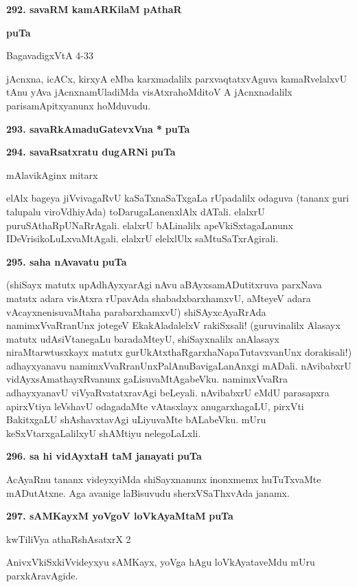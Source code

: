 \noindent
\textbf{292. savaRM kamARKilaM pAthaR} \hfill {\bf puTa \pageref{63}

\hfill BagavadigxVtA 4-33

\smallskip
jAcnxna, icACx, kirxyA eMba karxmadalilx parxvaqtatxvAguva kamaRvelalxvU tAnu yAva jAcnxnamUladiMda visAtxrahoMditoV A jAcnxnadalilx parisamApitxyanunx hoMduvudu.

\medskip
\noindent
\textbf{293. savaRkAmaduGatevxVna *} \hfill {\bf puTa \pageref{95}}

\smallskip
\noindent
\textbf{294. savaRsatxratu dugARNi} \hfill {\bf puTa \pageref{244}}

\hfill mAlavikAginx mitarx

\smallskip
elAlx bageya jiVvivagaRvU kaSaTxnaSaTxgaLa rUpadalilx odaguva (tananx guri talu\-palu viroVdhi\-yAda) toDarugaLanenxlAlx dATali. elalxrU puruSAthaRpUNaR\-rAgali.  elalxrU bALinalilx apeVkiSxtagaLanunx IDeV\-risi\-koLuLxvaMtAgali. elalxrU elelxlUlx saMtuSaTxrAgirali.

\medskip
\noindent
\textbf{295. saha nAvavatu} \hfill {\bf puTa \pageref{46a}}

\smallskip
(shiSayx matutx upAdhAyxyarAgi nAvu aBAyxsamADutitxruva parxNava matutx adara visAtxra rUpa\-vAda shabadxbarxhamxvU, aMteyeV adara vAcayxnenisuvaMtaha para\-barxhamxvU) shiSAyxcAyaRrAda namimxVvaR\-ranUnx jotegeV EkakAladalelxV rakiSxsali! (guruvinalilx Alasayx matutx udAsiVtanegaLu baradaMteyU, shiSayx\-nalilx anAlasayx niraMtarwtusxkayx matutx gurUkAtxthaRgarxhaNapaTutavxvanUnx dorakisali!) adhayx\-yanavu namimxVvaRranUnx\break PalAnuBavigaLanAnxgi mADali. nAvibabxrU vidAyxsAmathayxRvanunx gaLisuvaMtAga\-beVku. namimxV\-vaRra adhayxyanavU viVyaRvatatxravAgi beLeyali. nAvibabxrU eMdU parasapxra apirxVtiya leVshavU odaga\-daMte vAtasxlayx anugarxhagaLU, pirxVti BakitxgaLU shAshavxtavAgi uLiyuvaMte bALabeVku. mUru keSxVtarx\-gaLa\-lilxyU shAMtiyu nele\-goLaLxli.
 
\noindent
\textbf{296. sa hi vidAyxtaH taM janayati} \hfill {\bf puTa \pageref{91}}

\smallskip
AcAyaRnu tananx videyxyiMda shiSayxnanunx inonxmemx huTuTxvaMte mADutAtxne. Aga avanige laBisu\-vudu sherxVSaThxvAda janamx.

\medskip
\textbf{297. sAMKayxM yoVgoV loVkAyaMtaM} \hfill {\bf puTa \pageref{98}}

\hfill kwTiliVya athaRshAsatxrX 2

\smallskip
AnivxVkiSxkiVvideyxyu sAMKayx, yoVga hAgu loVkAyataveMdu mUru parxkAravAgide.

}
